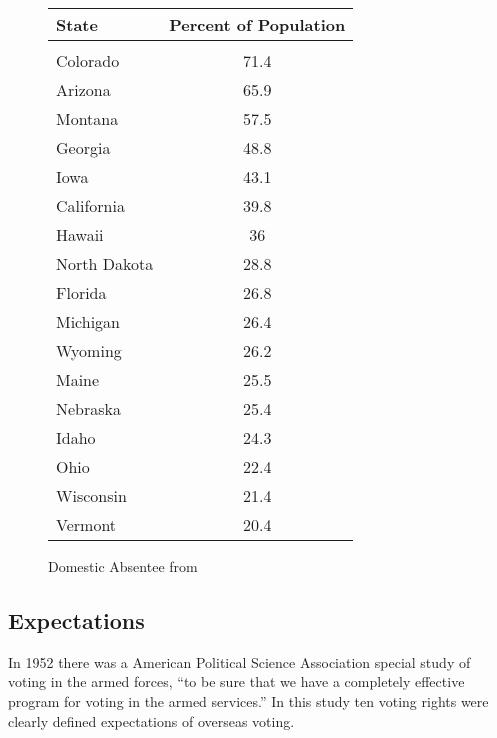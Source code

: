 \begin{figure}
\begin{center}
\begin{tabular}{l c}
State & Percent of Population\\\hline\\
Colorado & 71.4\\
Arizona & 65.9\\
Montana & 57.5\\
Georgia & 48.8\\
Iowa & 43.1\\
California & 39.8\\
Hawaii & 36\\
North Dakota & 28.8\\
Florida & 26.8\\
Michigan & 26.4\\
Wyoming & 26.2\\
Maine & 25.5\\
Nebraska & 25.4\\
Idaho & 24.3\\
Ohio & 22.4\\
Wisconsin & 21.4\\
Vermont & 20.4\\
\end{tabular}
\end{center}
\caption{Domestic Absentee from }
\label{fig:domestic_populations}
\end{figure}

\subsection{Expectations}

In 1952 there was a American Political Science Association special study of voting in the armed forces, ``to be sure that we have a completely effective program for voting in the armed services.'' In this study ten voting rights were clearly defined expectations of overseas voting.

